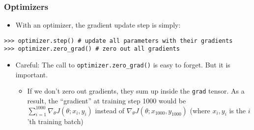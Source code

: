 \begin{frame}[fragile]
\frametitle{Optimizers}
\begin{itemize}
\item With an optimizer, the gradient update step is simply:
\end{itemize}
\begin{verbatim}
>>> optimizer.step() # update all parameters with their gradients
>>> optimizer.zero_grad() # zero out all gradients
\end{verbatim}
\begin{itemize}
\item Careful: The call to \texttt{optimizer.zero\_grad()} is easy to forget. But it is important.
\begin{itemize}
\item If we don't zero out gradients, they sum up inside the \texttt{grad} tensor. As a result, the ``gradient'' at training step 1000 would be $\sum_{i=1}^{1000} \nabla_\theta J(\theta; x_i, y_i)$ instead of $\nabla_\theta J(\theta; x_{1000}, y_{1000})$ (where $x_i, y_i$ is the $i$'th training batch)
\end{itemize}
\end{itemize}
\end{frame}

